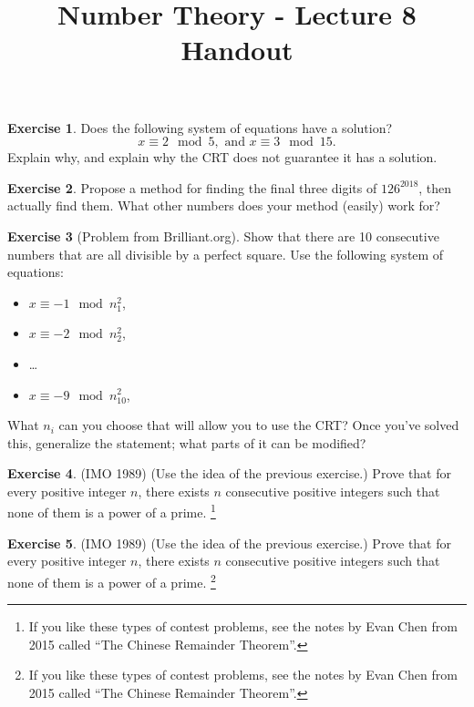 \documentclass[11pt]{article}
\theoremstyle{definition}
\newtheorem{exercise}{Exercise}
\numberwithin{thm}{section}
\begin{document}
\title{Number Theory - Lecture 8 Handout}

\maketitle


\begin{exercise} Does the following system of equations have a solution?
\[
	x \equiv 2 \mod 5, \text{   and  } x \equiv 3 \mod 15.
\]
Explain why, and explain why the CRT does not guarantee it has a solution.
\end{exercise}

\begin{exercise} Propose a method for finding the final three digits of $126^{2018}$, then actually find them. What other numbers does your method (easily) work for?
\end{exercise}

\begin{exercise} [Problem from Brilliant.org] Show that there are 10 consecutive numbers that are all divisible by a perfect square. Use the following system of equations:
\begin{itemize}
	\item $x \equiv -1 \mod n_1^2$,
    \item $x \equiv -2 \mod n_2^2$,
    \item \ldots
    \item $x \equiv -9 \mod n_{10}^2$,
\end{itemize}
What $n_i$ can you choose that will allow you to use the CRT? Once you've solved this, generalize the statement; what parts of it can be modified?
\end{exercise}

\begin{exercise} (IMO  1989) (Use the idea of the previous exercise.) Prove  that  for  every  positive  integer $n$, there  exists $n$ consecutive positive integers such that none of them is a power of a prime. \footnote{If you like these types of contest problems, see the notes by Evan Chen from 2015 called ``The Chinese Remainder Theorem''.}
\end{exercise}

\begin{exercise} (IMO  1989) (Use the idea of the previous exercise.) Prove  that  for  every  positive  integer $n$, there  exists $n$ consecutive positive integers such that none of them is a power of a prime. \footnote{If you like these types of contest problems, see the notes by Evan Chen from 2015 called ``The Chinese Remainder Theorem''.}
\end{exercise}
\end{document}
